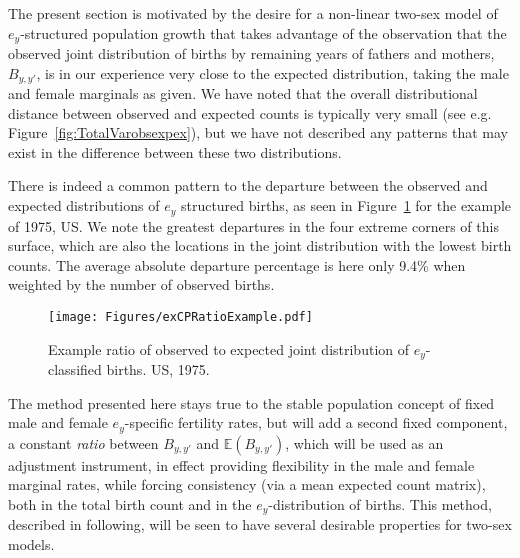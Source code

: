 \FloatBarrier
The present section is motivated by the desire for a non-linear two-sex model of
$e_y$-structured population growth that takes advantage of the observation that
the observed joint distribution of births by remaining years of fathers 
and mothers, $B_{y,y'}$, is in our experience very close to the expected
distribution, taking the male and female marginals as given. We have noted 
that the overall distributional distance
between observed and expected counts is typically very small (see e.g.
Figure~\ref{fig:TotalVarobsexpex}), but we have not described any patterns that
may exist in the difference between these two distributions. 

There is indeed a common pattern to the departure between the observed and
expected distributions of $e_y$ structured births, as seen in Figure~\ref{fig:exCPratioexample} for
the example of 1975, US. We note the greatest departures in the four extreme
corners of this surface, which are also the locations in the joint distribution 
with the lowest birth counts. The average absolute departure percentage is here
only 9.4\% when weighted by the number of observed births.

\begin{figure}[!ht]
  \centering
    \caption{Example ratio of observed to expected joint distribution of
    $e_y$-classified births. US, 1975.}
     \texttt{[image: Figures/exCPRatioExample.pdf]}
     \label{fig:exCPratioexample}
\end{figure}

The method presented here stays true to the stable population concept
 of fixed male and female $e_y$-specific fertility rates, but will add a second
 fixed component, a constant \textit{ratio} between $B_{y,y'}$ and
 $\mathbb{E}(B_{y,y'})$, which will be used as an adjustment instrument, in
 effect providing flexibility in the male and female marginal rates, while forcing
 consistency (via a mean expected count matrix), both in the total birth count
 and in the $e_y$-distribution of births. This method, described in
 following, will be seen to have several desirable properties for two-sex
 models.
 
\FloatBarrier


